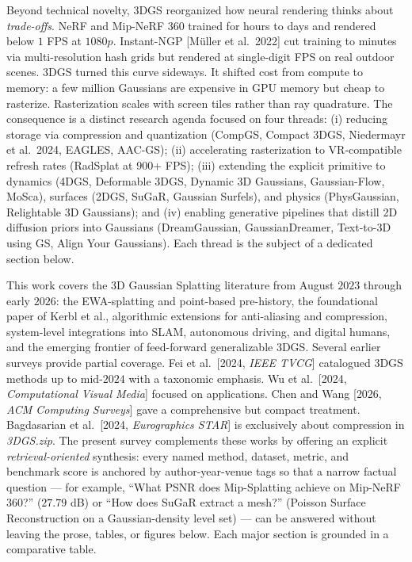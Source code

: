 Beyond technical novelty, 3DGS reorganized how neural rendering thinks about \emph{trade-offs}. NeRF and Mip-NeRF 360 trained for hours to days and rendered below \(1\) FPS at \(1080p\). Instant-NGP {[}Müller et al.~2022{]} cut training to minutes via multi-resolution hash grids but rendered at single-digit FPS on real outdoor scenes. 3DGS turned this curve sideways. It shifted cost from compute to memory: a few million Gaussians are expensive in GPU memory but cheap to rasterize. Rasterization scales with screen tiles rather than ray quadrature. The consequence is a distinct research agenda focused on four threads: (i) reducing storage via compression and quantization (CompGS, Compact 3DGS, Niedermayr et al.~2024, EAGLES, AAC-GS); (ii) accelerating rasterization to VR-compatible refresh rates (RadSplat at \(900\)+ FPS); (iii) extending the explicit primitive to dynamics (4DGS, Deformable 3DGS, Dynamic 3D Gaussians, Gaussian-Flow, MoSca), surfaces (2DGS, SuGaR, Gaussian Surfels), and physics (PhysGaussian, Relightable 3D Gaussians); and (iv) enabling generative pipelines that distill 2D diffusion priors into Gaussians (DreamGaussian, GaussianDreamer, Text-to-3D using GS, Align Your Gaussians). Each thread is the subject of a dedicated section below.

This work covers the 3D Gaussian Splatting literature from August \(2023\) through early \(2026\): the EWA-splatting and point-based pre-history, the foundational paper of Kerbl et al., algorithmic extensions for anti-aliasing and compression, system-level integrations into SLAM, autonomous driving, and digital humans, and the emerging frontier of feed-forward generalizable 3DGS. Several earlier surveys provide partial coverage. Fei et al.~{[}2024, \emph{IEEE TVCG}{]} catalogued 3DGS methods up to mid-\(2024\) with a taxonomic emphasis. Wu et al.~{[}2024, \emph{Computational Visual Media}{]} focused on applications. Chen and Wang {[}2026, \emph{ACM Computing Surveys}{]} gave a comprehensive but compact treatment. Bagdasarian et al.~{[}2024, \emph{Eurographics STAR}{]} is exclusively about compression in \emph{3DGS.zip}. The present survey complements these works by offering an explicit \emph{retrieval-oriented} synthesis: every named method, dataset, metric, and benchmark score is anchored by author-year-venue tags so that a narrow factual question --- for example, ``What PSNR does Mip-Splatting achieve on Mip-NeRF 360?'' (\(27.79\) dB) or ``How does SuGaR extract a mesh?'' (Poisson Surface Reconstruction on a Gaussian-density level set) --- can be answered without leaving the prose, tables, or figures below. Each major section is grounded in a comparative table.

